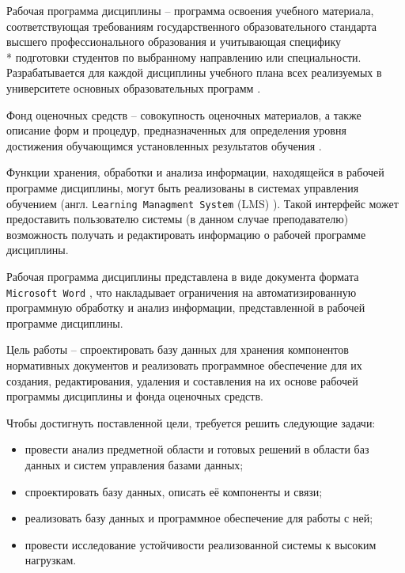 
Рабочая программа дисциплины -- программа освоения учебного материала, соответствующая требованиям государственного образовательного стандарта высшего профессионального образования и учитывающая специфику \\* подготовки студентов по выбранному направлению или специальности. Разрабатывается для каждой дисциплины учебного плана всех реализуемых в университете основных образовательных программ \cite{rpd}.

Фонд оценочных средств -- совокупность оценочных материалов, а также описание форм и процедур, предназначенных для определения уровня достижения обучающимся установленных результатов обучения \cite{fos}.

Функции хранения, обработки и анализа информации, находящейся в рабочей программе дисциплины, могут быть реализованы в системах управления обучением (англ. \texttt{Learning Managment System} (LMS) \cite{lms}). Такой интерфейс может предоставить пользователю системы (в данном случае преподавателю) возможность получать и редактировать информацию о рабочей программе дисциплины.

Рабочая программа дисциплины представлена в виде документа формата \texttt{Microsoft Word} \cite{ms-word}, что накладывает ограничения на автоматизированную программную обработку и анализ информации, представленной в рабочей программе дисциплины.

Цель работы -- спроектировать базу данных для хранения компонентов нормативных документов и реализовать программное обеспечение для их создания, редактирования, удаления и составления на их основе рабочей программы дисциплины и фонда оценочных средств. 

Чтобы достигнуть поставленной цели, требуется решить следующие задачи:
\begin{itemize}
	\item провести анализ предметной области и готовых решений в области баз данных и систем управления базами данных;
	\item спроектировать базу данных, описать её компоненты и связи;
	\item реализовать базу данных и программное обеспечение для работы с ней;
	\item провести исследование устойчивости реализованной системы к высоким нагрузкам.
\end{itemize}